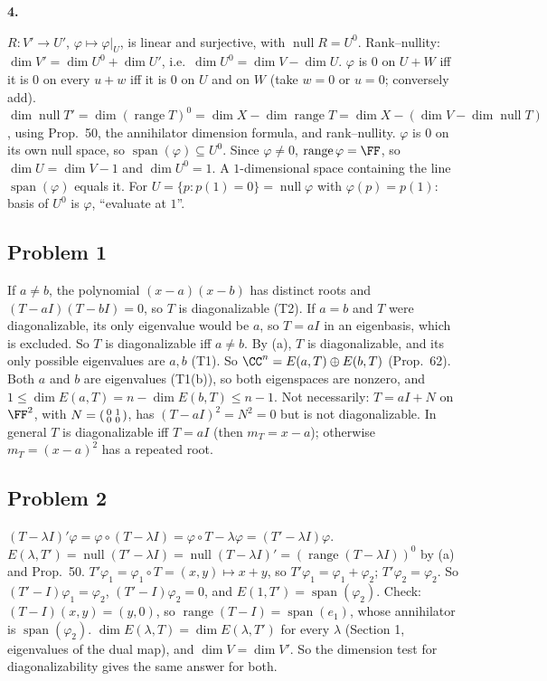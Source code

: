 \documentclass[10pt]{scrartcl}
\DeclareMathOperator{\nul}{null}
\DeclareMathOperator{\range}{range}
\DeclareMathOperator{\spn}{span}
\begin{document}
\textbf{4.}
\begin{enumerate}[a)]
  \ii $R\colon V'\to U'$, $\varphi\mapsto\varphi|_U$, is linear and surjective, with $\nul R=U^0$. Rank--nullity: $\dim V'=\dim U^0+\dim U'$, i.e.\ $\dim U^0=\dim V-\dim U$.
  \ii $\varphi$ is $0$ on $U+W$ iff it is $0$ on every $u+w$ iff it is $0$ on $U$ and on $W$ (take $w=0$ or $u=0$; conversely add).
  \ii $\dim\nul T'=\dim(\range T)^0=\dim X-\dim\range T=\dim X-(\dim V-\dim\nul T)$, using Prop.~50, the annihilator dimension formula, and rank--nullity.
  \ii $\varphi$ is $0$ on its own null space, so $\spn(\varphi)\subseteq U^0$. Since $\varphi\ne0$, $\range\varphi=\FF$, so $\dim U=\dim V-1$ and $\dim U^0=1$. A $1$-dimensional space containing the line $\spn(\varphi)$ equals it. For $U=\{p:p(1)=0\}=\nul\varphi$ with $\varphi(p)=p(1)$: basis of $U^0$ is $\varphi$, ``evaluate at $1$''.
\end{enumerate}

\subsection*{Problem 1}
\begin{enumerate}[(a)]
  \ii If $a\ne b$, the polynomial $(x-a)(x-b)$ has distinct roots and $(T-aI)(T-bI)=0$, so $T$ is diagonalizable (T2). If $a=b$ and $T$ were diagonalizable, its only eigenvalue would be $a$, so $T=aI$ in an eigenbasis, which is excluded. So $T$ is diagonalizable iff $a\ne b$.
  \ii By (a), $T$ is diagonalizable, and its only possible eigenvalues are $a,b$ (T1). So $\CC^n=E(a,T)\oplus E(b,T)$ (Prop.~62). Both $a$ and $b$ are eigenvalues (T1(b)), so both eigenspaces are nonzero, and $1\le\dim E(a,T)=n-\dim E(b,T)\le n-1$.
  \ii Not necessarily: $T=aI+N$ on $\FF^2$, with $N=\begin{psmallmatrix}0&1\\0&0\end{psmallmatrix}$, has $(T-aI)^2=N^2=0$ but is not diagonalizable. In general $T$ is diagonalizable iff $T=aI$ (then $m_T=x-a$); otherwise $m_T=(x-a)^2$ has a repeated root.
\end{enumerate}

\subsection*{Problem 2}
\begin{enumerate}[(a)]
  \ii $(T-\lambda I)'\varphi=\varphi\circ(T-\lambda I)=\varphi\circ T-\lambda\varphi=(T'-\lambda I)\varphi$.
  \ii $E(\lambda,T')=\nul(T'-\lambda I)=\nul(T-\lambda I)'=(\range(T-\lambda I))^0$ by (a) and Prop.~50.
  \ii $T'\varphi_1=\varphi_1\circ T=(x,y)\mapsto x+y$, so $T'\varphi_1=\varphi_1+\varphi_2$; $T'\varphi_2=\varphi_2$. So $(T'-I)\varphi_1=\varphi_2$, $(T'-I)\varphi_2=0$, and $E(1,T')=\spn(\varphi_2)$. Check: $(T-I)(x,y)=(y,0)$, so $\range(T-I)=\spn(e_1)$, whose annihilator is $\spn(\varphi_2)$.
  \ii $\dim E(\lambda,T)=\dim E(\lambda,T')$ for every $\lambda$ (Section 1, eigenvalues of the dual map), and $\dim V=\dim V'$. So the dimension test for diagonalizability gives the same answer for both.
\end{enumerate}
\end{document}

